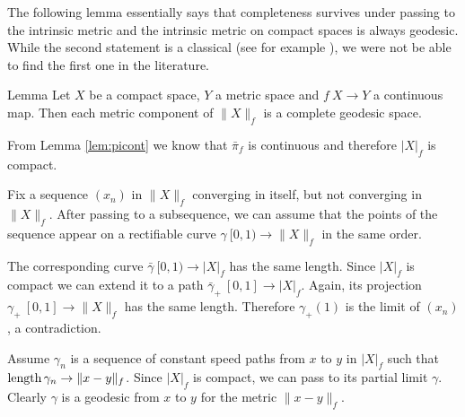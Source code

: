 \documentclass{article}
\begin{document}
The following lemma essentially says that completeness survives under passing to the intrinsic metric
and the intrinsic metric on compact spaces is always geodesic.
While the second statement is a classical (see for example \cite[II-\S8 Thm. 3]{KF}), 
we were not be able to find the first one in the literature.

\begin{thm}{Lemma}\label{lem:geospace}
Let $X$ be a compact %
space, $Y$ a metric space and $f\:X\to Y$ a continuous map. 
Then each metric component of $\|X\|_f$ is a complete geodesic space.
\end{thm}

From Lemma \ref{lem:picont} we know that $\bar\pi_f$ is continuous and therefore $|X|_f$ is compact.

Fix a sequence $(x_n)$ in $\|X\|_f$ converging in itself, but not converging in $\|X\|_f$.
After passing to a subsequence, we can assume that the points of the sequence appear on a rectifiable curve $\gamma\:[0,1)\to\|X\|_f$ in the same order.

The corresponding curve $\bar\gamma\:[0,1)\to |X|_f$ has the same length.
Since $|X|_f$ is compact we can extend it to a path $\bar\gamma_+\:[0,1]\to |X|_f$.
Again, its projection $\gamma_+\:[0,1]\to\|X\|_f$ has the same length.
Therefore $\gamma_+(1)$ is the limit of $(x_n)$, a contradiction.

Assume $\gamma_n$ is a sequence of constant speed paths from $x$ to $y$ in $|X|_f$
such that $\mathop{\rm length}\nolimits\gamma_n\to \|x-y\|_f$.
Since $|X|_f$ is compact, we can pass to its partial limit $\gamma$.
Clearly $\gamma$ is a geodesic from $x$ to $y$ for the metric $\|x-y\|_f$.
\qeds


\end{document}
